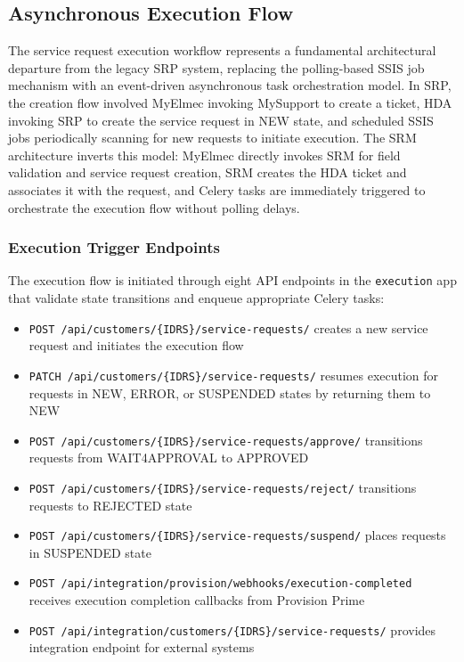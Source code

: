 \subsection{Asynchronous Execution Flow}

The service request execution workflow represents a fundamental architectural departure from the legacy SRP system, replacing the polling-based SSIS job mechanism with an event-driven asynchronous task orchestration model. In SRP, the creation flow involved MyElmec invoking MySupport to create a ticket, HDA invoking SRP to create the service request in NEW state, and scheduled SSIS jobs periodically scanning for new requests to initiate execution. The SRM architecture inverts this model: MyElmec directly invokes SRM for field validation and service request creation, SRM creates the HDA ticket and associates it with the request, and Celery tasks are immediately triggered to orchestrate the execution flow without polling delays.

\subsubsection{Execution Trigger Endpoints}

The execution flow is initiated through eight API endpoints in the \texttt{execution} app that validate state transitions and enqueue appropriate Celery tasks:

\begin{itemize}
\item \texttt{POST /api/customers/\{IDRS\}/service-requests/} creates a new service request and initiates the execution flow
\item \texttt{PATCH /api/customers/\{IDRS\}/service-requests/} resumes execution for requests in NEW, ERROR, or SUSPENDED states by returning them to NEW
\item \texttt{POST /api/customers/\{IDRS\}/service-requests/approve/} transitions requests from WAIT4APPROVAL to APPROVED
\item \texttt{POST /api/customers/\{IDRS\}/service-requests/reject/} transitions requests to REJECTED state
\item \texttt{POST /api/customers/\{IDRS\}/service-requests/suspend/} places requests in SUSPENDED state
\item \texttt{POST /api/integration/provision/webhooks/execution-completed} receives execution completion callbacks from Provision Prime
\item \texttt{POST /api/integration/customers/\{IDRS\}/service-requests/} provides integration endpoint for external systems
\end{itemize}

